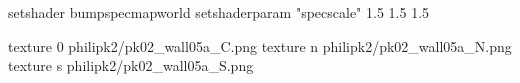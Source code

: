 setshader bumpspecmapworld
setshaderparam "specscale" 1.5 1.5 1.5

texture 0 philipk2/pk02_wall05a_C.png
texture n philipk2/pk02_wall05a_N.png
texture s philipk2/pk02_wall05a_S.png

